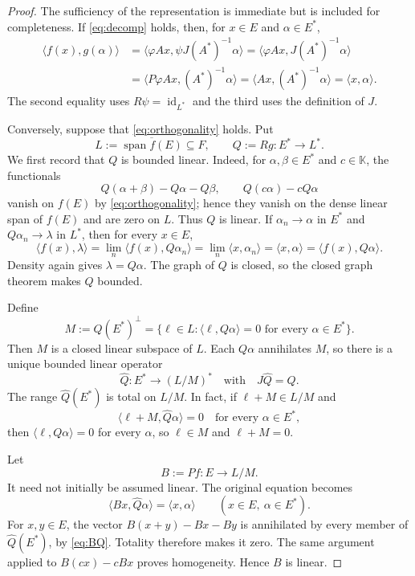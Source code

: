 \documentclass[11pt]{article}
\newcommand{\K}{\mathbb K}
\newcommand{\pair}[2]{\langle #1,#2\rangle}
\newcommand{\id}{\operatorname{id}}
\newcommand{\linspan}{\operatorname{span}}
\begin{document}
\begin{proof}
The sufficiency of the representation is immediate but is included for completeness. If \eqref{eq:decomp} holds, then, for $x\in E$ and $\alpha\in E^*$,
\begin{align*}
 \pair{f(x)}{g(\alpha)}
 &=\pair{\varphi Ax}{\psi J(A^*)^{-1}\alpha}
  =\pair{\varphi Ax}{J(A^*)^{-1}\alpha}\\
 &=\pair{P\varphi Ax}{(A^*)^{-1}\alpha}
  =\pair{Ax}{(A^*)^{-1}\alpha}
  =\pair{x}{\alpha}.
\end{align*}
The second equality uses $R\psi=\id_{L^*}$ and the third uses the definition of $J$.

Conversely, suppose that \eqref{eq:orthogonality} holds. Put
\[
  L:=\overline{\linspan f(E)}\subseteq F,
  \qquad Q:=Rg:E^*\longrightarrow L^*.
\]
We first record that $Q$ is bounded linear. Indeed, for $\alpha,\beta\in E^*$ and $c\in\K$, the functionals
\[
 Q(\alpha+\beta)-Q\alpha-Q\beta,
 \qquad Q(c\alpha)-cQ\alpha
\]
vanish on $f(E)$ by \eqref{eq:orthogonality}; hence they vanish on the dense linear span of $f(E)$ and are zero on $L$. Thus $Q$ is linear. If $\alpha_n\to\alpha$ in $E^*$ and $Q\alpha_n\to\lambda$ in $L^*$, then for every $x\in E$,
\[
 \pair{f(x)}{\lambda}
 =\lim_n\pair{f(x)}{Q\alpha_n}
 =\lim_n\pair{x}{\alpha_n}
 =\pair{x}{\alpha}
 =\pair{f(x)}{Q\alpha}.
\]
Density again gives $\lambda=Q\alpha$. The graph of $Q$ is closed, so the closed graph theorem makes $Q$ bounded.

Define
\[
  M:=Q(E^*)^\perp
  =\{\ell\in L:\pair{\ell}{Q\alpha}=0\text{ for every }\alpha\in E^*\}.
\]
Then $M$ is a closed linear subspace of $L$. Each $Q\alpha$ annihilates $M$, so there is a unique bounded linear operator
\[
  \widehat Q:E^*\longrightarrow (L/M)^*
  \quad\text{with}\quad J\widehat Q=Q.
\]
The range $\widehat Q(E^*)$ is total on $L/M$. In fact, if $\ell+M\in L/M$ and
\[
  \pair{\ell+M}{\widehat Q\alpha}=0
  \quad\text{for every }\alpha\in E^*,
\]
then $\pair{\ell}{Q\alpha}=0$ for every $\alpha$, so $\ell\in M$ and $\ell+M=0$.

Let
\[
  B:=Pf:E\longrightarrow L/M.
\]
It need not initially be assumed linear. The original equation becomes
\begin{equation}\label{eq:BQ}
  \pair{Bx}{\widehat Q\alpha}=\pair{x}{\alpha}
  \qquad(x\in E,\ \alpha\in E^*).
\end{equation}
For $x,y\in E$, the vector $B(x+y)-Bx-By$ is annihilated by every member of $\widehat Q(E^*)$, by \eqref{eq:BQ}. Totality therefore makes it zero. The same argument applied to $B(cx)-cBx$ proves homogeneity. Hence $B$ is linear.


\end{proof}
\end{document}
